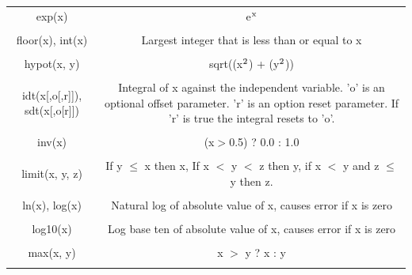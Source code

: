 \begin{longtable}{c c}
exp(x) & \begin{minipage}{20em}
e$\rm{^x}$
\end{minipage}\\ \\

floor(x), int(x) & \begin{minipage}{20em}
Largest integer that is less than or equal to x
\end{minipage}\\ \\

hypot(x, y) & \begin{minipage}{20em}
sqrt((x$\rm{^2}$) + (y$\rm{^2}$))
\end{minipage}\\ \\

idt(x[,o[,r]]), sdt(x[,o[r]]) & \begin{minipage}{20em}
Integral of x against the independent variable. 'o' is an optional offset parameter. 'r' is an option reset parameter. If 'r' is true the integral resets to 'o'.
\end{minipage}\\ \\

inv(x) & \begin{minipage}{20em}
(x$>$0.5) ? 0.0 : 1.0
\end{minipage}\\ \\

limit(x, y, z) & \begin{minipage}{20em}
If y $\leq$ x then x, If x $<$ y $<$ z then y, if x $<$ y and z $\leq$ y then z.  
\end{minipage}\\ \\

ln(x), log(x) & \begin{minipage}{20em}
Natural log of absolute value of x, causes error if x is zero
\end{minipage}\\ \\

log10(x) & \begin{minipage}{20em}
Log base ten of absolute value of x, causes error if x is zero
\end{minipage}\\ \\

max(x, y) & \begin{minipage}{20em}
x $>$ y ? x : y
\end{minipage}\\ \\


\end{longtable}
